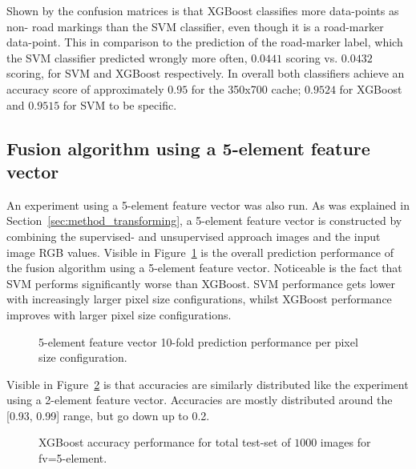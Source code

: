 Shown by the confusion matrices is that XGBoost classifies more data-points as non- road markings than the SVM classifier, even though it is a road-marker data-point. This in comparison to the prediction of the road-marker label, which the SVM classifier predicted wrongly more often, $0.0441$ scoring vs. $0.0432$ scoring, for SVM and XGBoost respectively. In overall both classifiers achieve an accuracy score of approximately $0.95$ for the 350x700 cache; $0.9524$ for XGBoost and $0.9515$ for SVM to be specific.


\subsection{Fusion algorithm using a 5-element feature vector}
An experiment using a 5-element feature vector was also run. As was explained in Section~\ref{sec:method_transforming}, a 5-element feature vector is constructed by combining the supervised- and unsupervised approach images and the input image RGB values. Visible in Figure~\ref{fig:5-element-fv-classifiers-cache-performance} is the overall prediction performance of the fusion algorithm using a 5-element feature vector. Noticeable is the fact that SVM performs significantly worse than XGBoost. SVM performance gets lower with increasingly larger pixel size configurations, whilst XGBoost performance improves with larger pixel size configurations.

\begin{figure}[ht]
  \centering
  
  \caption{5-element feature vector 10-fold prediction performance per pixel size configuration.
  }\label{fig:5-element-fv-classifiers-cache-performance}
\end{figure}

Visible in Figure~\ref{fig:5-element-fv-xgboost-violinplot} is that accuracies are similarly distributed like the experiment using a 2-element feature vector. Accuracies are mostly distributed around the [0.93, 0.99] range, but go down up to 0.2.

\begin{figure}[ht]
  \centering
  
  \caption{XGBoost accuracy performance for total test-set of $1000$ images for fv=5-element.
  }\label{fig:5-element-fv-xgboost-violinplot}
\end{figure}

